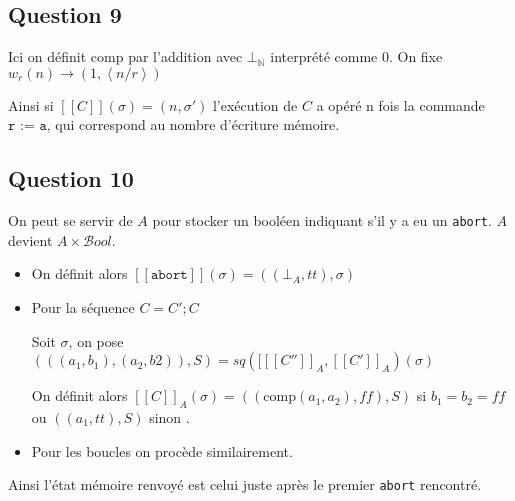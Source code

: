 \documentclass{article}
\newcommand{\N}{\mathbb{N}}
\newcommand{\Cr}[1]{[\![#1]\!]}
\newcommand{\Co}[1]{\left \langle #1 \right \rangle}
\newcommand{\comp}{\text{comp}}
\newcommand{\bool}{\mathcal{B}\textit{ool}}
\begin{document}
\subsection*{Question 9}

Ici on définit $\comp$ par l'addition avec $\bot_\N$ interprété comme 0. On fixe $w_r(n)\rightarrow (1,\Co{n/r})$

Ainsi si $\Cr{C}(\sigma)=(n,\sigma')$ l'exécution de $C$ a opéré n fois la commande $\texttt{r := a}$, qui correspond au nombre d'écriture mémoire.

\subsection*{Question 10}

On peut se servir de $A$ pour stocker un booléen indiquant s'il y a eu un \texttt{abort}. $A$ devient $A\times \bool$.

\begin{itemize}
\item On définit alors  $[[\texttt{abort}]](\sigma)=((\bot_A,tt),\sigma)$

\item Pour la séquence $C = C' ; C$
    
    Soit $\sigma$, on pose $ \left (\left ((a_1,b_1),(a_2,b2)\right ),S\right )=sq\left ([\Cr{C''}_A,\Cr{C'}_A\right )\left (\sigma\right )$ 
    
    On définit alors $\Cr{C}_A\left (\sigma\right ) =\left ( \left (\comp\left (a_1,a_2\right ),ff\right ), S\right )$ si $b_1=b_2=ff$ ou $\left ( \left ( a_1 ,tt\right ), S\right )$ sinon .
    
    \item Pour les boucles on procède similairement.

\end{itemize}

Ainsi l'état mémoire renvoyé est celui juste après le premier \texttt{abort} rencontré.
\end{document}
